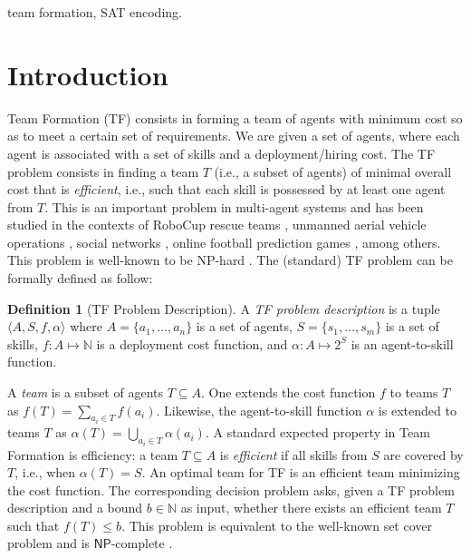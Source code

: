 \documentclass[conference]{IEEEtran}
\theoremstyle{definition}
\newtheorem{definition}{Definition}
\begin{document}
\begin{IEEEkeywords}
team formation, SAT encoding.
\end{IEEEkeywords}

\section{Introduction}

Team Formation (TF) consists in forming a team of agents with minimum cost so as 
to meet a certain set of requirements. 
We are given a set of agents, where each agent is associated with a set of skills and a 
deployment/hiring cost. The TF problem consists in finding a team $T$ 
(i.e., a subset of agents) of minimal overall cost that is \emph{efficient}, i.e.,
such that each skill is possessed by at least one agent from $T$. 
This is an important problem in multi-agent systems and has been studied in the 
contexts of RoboCup rescue teams \cite{DBLP:journals/aim/KitanoT01}, 
unmanned aerial vehicle operations \cite{DBLP:conf/atal/GeorgePSS10}, 
social networks \cite{KargarAZ12,FarhadiHHH12}, 
online football prediction games \cite{MatthewsRC12}, among others. 
This problem is well-known to be NP-hard \cite{DBLP:books/fm/GareyJ79,Okimoto2015}.
The (standard) TF problem \cite{Okimoto2015} can be formally defined as follow:

\begin{definition}[TF Problem Description]
	A \textit{TF problem description} is a tuple $\langle A, S, f, \alpha\rangle$ 
	where $A = \{a_1, \ldots ,a_n\}$ is a set of agents, $S = \{s_1, \ldots, s_m\}$ is a set of 
	skills, $f : A \mapsto \mathbb{N}$ is a deployment cost function, and $\alpha : A \mapsto 2^S$ is an agent-to-skill function.
	\label{def:TFpd}
\end{definition}

A \emph{team} is a subset of agents $T \subseteq A$.
One extends the cost function $f$ to teams $T$ as $f(T) = \sum_{a_i \in T}{f(a_i)}$.
Likewise, the agent-to-skill function $\alpha$ is extended to teams $T$
as $\alpha(T) = \bigcup_{a_i \in T}{\alpha(a_i)}$.
A standard expected property in Team Formation is efficiency:
a team $T \subseteq A$ is \emph{efficient} if all skills from $S$ are covered
by $T$, i.e., when $\alpha(T) = S$.  An optimal team for TF is an
efficient team minimizing the cost function.  The corresponding decision
problem asks, given a TF problem description and a
bound $b \in \mathbb{N}$ as input, whether there exists an
efficient team $T$ such that $f(T) \leq b$.  This problem is
equivalent to the well-known set cover problem
\cite{DBLP:books/fm/GareyJ79} and is $\mathsf{NP}$-complete \cite{Okimoto2015}. \\
\end{document}
